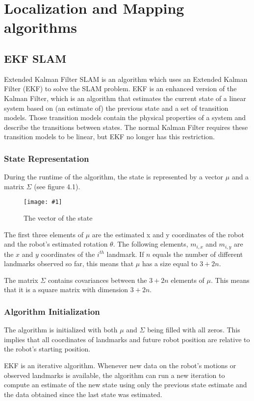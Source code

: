 \documentclass{ba-kecs}
\numberwithin{figure}{section}
\numberwithin{equation}{section}
\newcommand{\dkepic}[2]{ %
	\begin{figure}[H] %
	\texttt{[image: \#1]}
	\caption{#2}
	\label{#1}
	\end{figure}
}
\begin{document}
{\section{Localization and Mapping algorithms}

\subsection{EKF SLAM}
Extended Kalman Filter SLAM is an algorithm which uses an Extended Kalman Filter (EKF) to solve the SLAM problem. EKF is an enhanced version of the Kalman Filter, which is an algorithm that estimates the current state of a linear system based on (an estimate of) the previous state and a set of transition models. Those transition models contain the physical properties of a system and describe the transitions between states. The normal Kalman Filter requires these transition models to be linear, but EKF no longer has this restriction.

\subsubsection{State Representation}
During the runtime of the algorithm, the state is represented by a vector $\mu$ and a matrix $\Sigma$ (see figure 4.1).
\dkepic{bigMatrix}{The vector of the state \cite{vec}}
The first three elements of $\mu$ are the estimated x and y coordinates of the robot and the robot’s estimated rotation $\theta$. The following elements, $m_{i,x}$ and $m_{i,y}$ are the $x$ and $y$ coordinates of the $i^{th}$ landmark. If $n$ equals the number of different landmarks observed so far, this means that $\mu$ has a size equal to $3 + 2n$.

The matrix $\Sigma$ contains covariances between the $3 + 2n$ elements of $\mu$. This means that it is a square matrix with dimension $3 + 2n$.

\subsubsection{Algorithm Initialization}
The algorithm is initialized with both $\mu$ and $\Sigma$ being filled with all zeros. This implies that all coordinates of landmarks and future robot position are relative to the robot’s starting position.

EKF is an iterative algorithm. Whenever new data on the robot’s motions or observed landmarks is available, the algorithm can run a new iteration to compute an estimate of the new state using only the previous state estimate and the data obtained since the last state was estimated.

}
\end{document}
